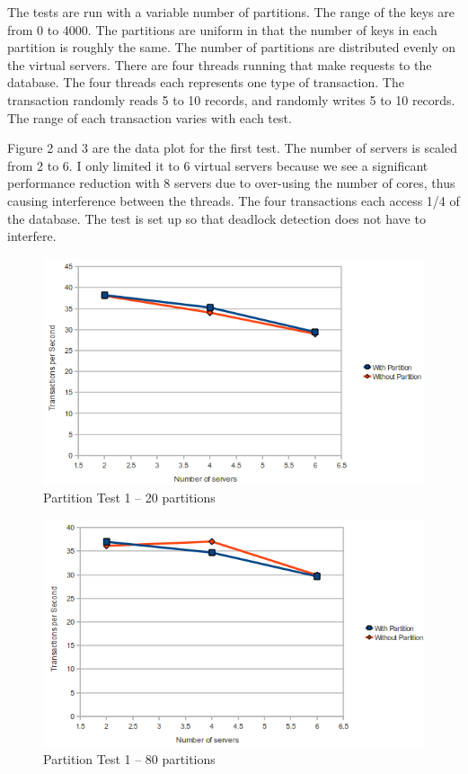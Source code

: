 \documentclass[a4paper, 10pt, notitlepage]{article}
\begin{document}
The tests are run with a variable number of partitions. The range of the keys are from 0 to 4000. The partitions are uniform in that the number
of keys in each partition is roughly the same. The number of partitions are distributed evenly on the virtual servers.
There are four threads running that make requests to the database. The four threads each
represents one type of transaction. The transaction randomly reads 5 to 10 records, and randomly writes 5 to 10 records.
The range of each transaction varies with each test.

Figure 2 and 3 are the data plot for the first test. The number of servers is scaled from 2 to 6. I only
limited it to 6 virtual servers because we see a significant performance reduction with 8 servers due to over-using the number
of cores, thus causing interference between the threads. The four transactions each access 1/4 of the database. The test is 
set up so that deadlock detection does not have to interfere. 

\begin{figure}[h!]

  \centering
    \includegraphics[scale=0.7]{peval1.png}
  \caption{Partition Test 1 -- 20 partitions}
\end{figure}

\begin{figure}[h!]

  \centering
    \includegraphics[scale=0.7]{peval2.png}
  \caption{Partition Test 1 -- 80 partitions}
\end{figure}
\end{document}
